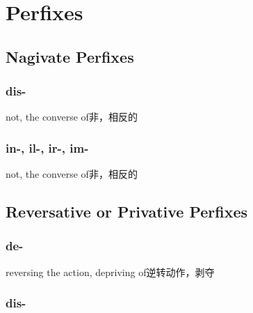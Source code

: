 \chapter{Perfixes}

\section{Nagivate Perfixes}

\subsection{dis-}

\begin{nlist}{not, the converse of}{非，相反的}
\end{nlist}

\subsection{in-, il-, ir-, im-}

\begin{nlist}{not, the converse of}{非，相反的}
\end{nlist}

\section{Reversative or Privative Perfixes}

\subsection{de-}

\begin{nlist}{reversing the action, depriving of}{逆转动作，剥夺}
\end{nlist}

\subsection{dis-}

